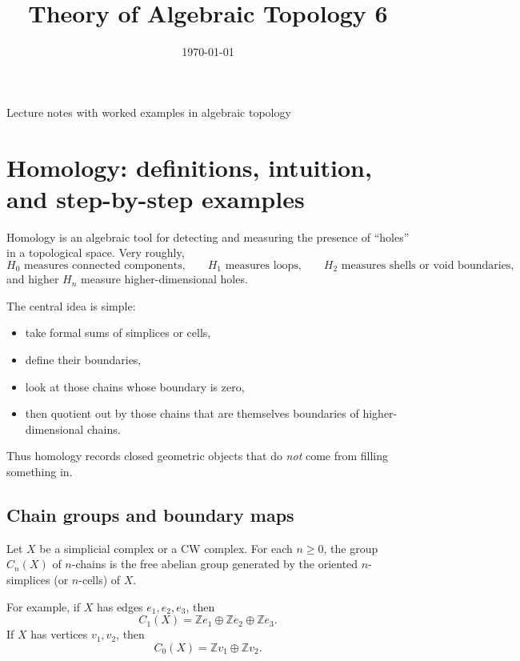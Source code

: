 \documentclass[12pt,a4paper]{article}
\title{\vspace{-1.5em}\bfseries Theory of Algebraic Topology 6}
\author{}
\date{\today}
\theoremstyle{notespace}
\begin{document}
	\maketitle
	\thispagestyle{plain}
		\begin{center}
		\begin{minipage}{0.92\textwidth}
			Lecture notes with worked examples in algebraic topology
		\end{minipage}
	\end{center}
		\tableofcontents
	\clearpage

\section{Homology: definitions, intuition, and step-by-step examples}

Homology is an algebraic tool for detecting and measuring the presence of ``holes'' in a topological space. Very roughly,
\[
H_0 \text{ measures connected components,}
\qquad
H_1 \text{ measures loops,}
\qquad
H_2 \text{ measures shells or void boundaries,}
\]
and higher \(H_n\) measure higher-dimensional holes.

The central idea is simple:
\begin{itemize}
	\item take formal sums of simplices or cells,
	\item define their boundaries,
	\item look at those chains whose boundary is zero,
	\item then quotient out by those chains that are themselves boundaries of higher-dimensional chains.
\end{itemize}
Thus homology records closed geometric objects that do \emph{not} come from filling something in.

\subsection{Chain groups and boundary maps}

Let \(X\) be a simplicial complex or a CW complex. For each \(n\geq 0\), the group \(C_n(X)\) of \(n\)-chains is the free abelian group generated by the oriented \(n\)-simplices (or \(n\)-cells) of \(X\).

For example, if \(X\) has edges \(e_1,e_2,e_3\), then
\[
C_1(X)=\mathbb{Z}e_1\oplus \mathbb{Z}e_2\oplus \mathbb{Z}e_3.
\]
If \(X\) has vertices \(v_1,v_2\), then
\[
C_0(X)=\mathbb{Z}v_1\oplus \mathbb{Z}v_2.
\]
\end{document}
